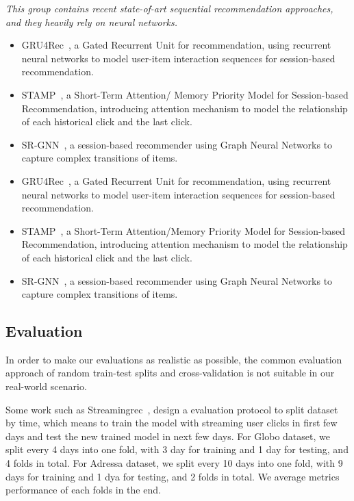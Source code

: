\textit{This group contains recent state-of-art sequential recommendation approaches, and they heavily rely on neural networks.}
\begin{itemize}
  \item GRU4Rec~\cite{hidasi2015session,hidasi2018recurrent}, a Gated Recurrent Unit for recommendation, using recurrent neural networks to model user-item interaction sequences for session-based recommendation.
  \item STAMP~\cite{liu2018stamp}, a Short-Term Attention/ Memory Priority Model for Session-based Recommendation, introducing attention mechanism to model the relationship of each historical click and the last click.
  \item SR-GNN~\cite{wu2019session}, a session-based recommender using Graph Neural Networks to capture complex transitions of items.
  \item GRU4Rec~\cite{hidasi2015session,hidasi2018recurrent}, a Gated Recurrent Unit for recommendation, using recurrent neural networks to model user-item interaction sequences for session-based recommendation.
  \item STAMP~\cite{liu2018stamp}, a Short-Term Attention/Memory Priority Model for Session-based Recommendation, introducing attention mechanism to model the relationship of each historical click and the last click.
  \item SR-GNN~\cite{wu2019session}, a session-based recommender using Graph Neural Networks to capture complex transitions of items.
\end{itemize}
\subsection{Evaluation}
In order to make our evaluations as realistic as possible, the common evaluation approach of random train-test splits and cross-validation is not suitable in our real-world scenario.

Some work such as Streamingrec~\cite{jugovac_streamingrec:_2018}, design a evaluation protocol to split dataset by time, which means to train the model with streaming user clicks in first few days and test the new trained model in next few days. For Globo dataset, we split every 4 days into one fold, with 3 day for training and 1 day for testing, and 4 folds in total. For Adressa dataset, we split every 10 days into one fold, with 9 days for training and 1 dya for testing, and 2 folds in total. We average metrics performance of each folds in the end.

